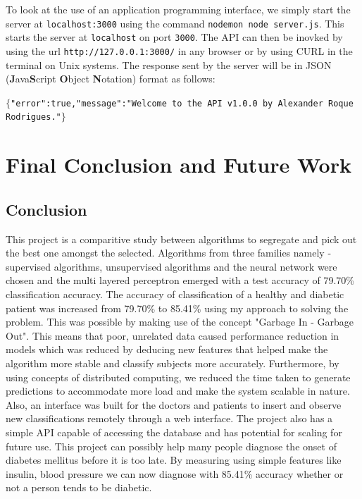\documentclass[12pt]{article}
\begin{document}
To look at the use of an application programming interface, we simply start the server at \texttt{localhost:3000} using the command \texttt{nodemon node server.js}. This starts the server at \texttt{localhost} on port \texttt{3000}. The API can then be inovked by using the url \texttt{http://127.0.0.1:3000/} in any browser or by using CURL in the terminal on Unix systems. The response sent by the server will be in JSON (\textbf{J}ava\textbf{S}cript \textbf{O}bject \textbf{N}otation) format as follows:
\begin{center}
$\lbrace$\texttt{"error":true,"message":"Welcome to the API v1.0.0 by Alexander Roque Rodrigues."}$\rbrace$
\end{center}







\clearpage
\newpage
\section{Final Conclusion and Future Work}
\subsection{Conclusion}
This project is a comparitive study between algorithms to segregate and pick out the best one amongst the selected. Algorithms from three families namely - supervised algorithms, unsupervised algorithms and the neural network were chosen and the multi layered perceptron emerged with a test accuracy of 79.70\% classification accuracy. The accuracy of classification of a healthy and diabetic patient was increased from 79.70\% to 85.41\% using my approach to solving the problem. This was possible by making use of the concept "Garbage In - Garbage Out". This means that poor, unrelated data caused performance reduction in models which was reduced by deducing new features that helped make the algorithm more stable and classify subjects more accurately. Furthermore, by using concepts of distributed computing, we reduced the time taken to generate predictions to accommodate more load and make the system scalable in nature. Also, an interface was built for the doctors and patients to insert and observe new classifications remotely through a web interface. The project also has a simple API capable of accessing the database and has potential for scaling for future use. This project can possibly help many people diagnose the onset of diabetes mellitus before it is too late. By measuring using simple features like insulin, blood pressure we can now diagnose with 85.41\% accuracy whether or not a person tends to be diabetic.
\end{document}
